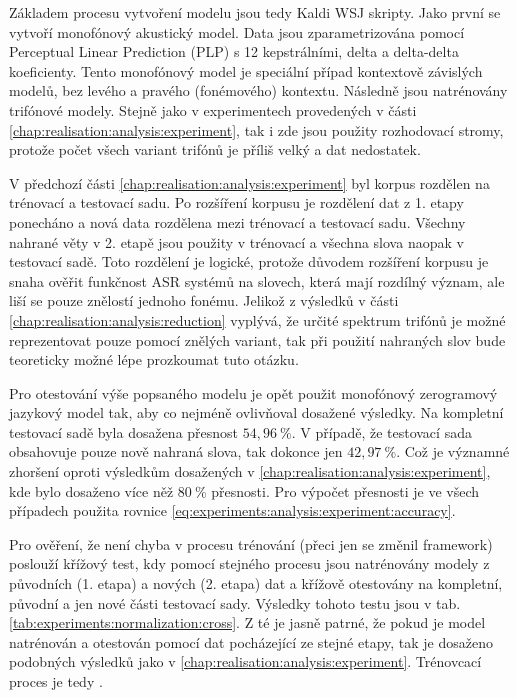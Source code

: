 Základem procesu vytvoření modelu jsou tedy Kaldi WSJ skripty. Jako první se vytvoří monofónový akustický model. Data jsou zparametrizována pomocí Perceptual Linear Prediction (PLP) s 12 kepstrálními, delta a delta-delta koeficienty. Tento monofónový model je speciální případ kontextově závislých modelů, bez levého a pravého (fonémového) kontextu. Následně jsou natrénovány trifónové modely. Stejně jako v experimentech provedených v části \ref{chap:realisation:analysis:experiment}, tak i zde jsou použity rozhodovací stromy, protože počet všech variant trifónů je příliš velký a dat nedostatek.

V předchozí části \ref{chap:realisation:analysis:experiment} byl korpus rozdělen na trénovací a testovací sadu. Po rozšíření korpusu je rozdělení dat z 1. etapy ponecháno a nová data rozdělena mezi trénovací a testovací sadu. Všechny nahrané věty v 2. etapě jsou použity v trénovací a všechna slova naopak v testovací sadě. Toto rozdělení je logické, protože důvodem rozšíření korpusu je snaha ověřit funkčnost ASR systémů na slovech, která mají rozdílný význam, ale liší se pouze znělostí jednoho fonému. Jelikož z výsledků v části \ref{chap:realisation:analysis:reduction} vyplývá, že určité spektrum trifónů je možné reprezentovat pouze pomocí znělých variant, tak při použití nahraných slov bude teoreticky možné lépe prozkoumat tuto otázku.

Pro otestování výše popsaného modelu je opět použit monofónový zerogramový jazykový model tak, aby co nejméně ovlivňoval dosažené výsledky. Na kompletní testovací sadě byla dosažena přesnost $54,96\ \%$. V případě, že testovací sada obsahovuje pouze nově nahraná slova, tak dokonce jen $42,97\ \%$. Což je významné zhoršení oproti výsledkům dosažených v \ref{chap:realisation:analysis:experiment}, kde bylo dosaženo více něž $80\ \%$ přesnosti. Pro výpočet přesnosti je ve všech případech použita rovnice \ref{eq:experiments:analysis:experiment:accuracy}.

Pro ověření, že není chyba v procesu trénování (přeci jen se změnil framework) poslouží křížový test, kdy pomocí stejného procesu jsou natrénovány modely z původních (1. etapa) a nových (2. etapa) dat a křížově otestovány na kompletní, původní a jen nové části testovací sady. Výsledky tohoto testu jsou v tab. \ref{tab:experiments:normalization:cross}. Z té je jasně patrné, že pokud je model natrénován a otestován pomocí dat pocházející ze stejné etapy, tak je dosaženo podobných výsledků jako v \ref{chap:realisation:analysis:experiment}. Trénovcací proces je tedy .

